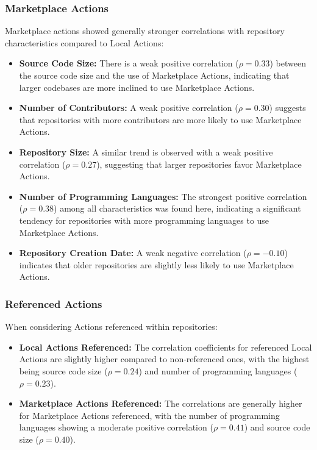 \documentclass[conference]{IEEEtran}
\begin{document}
      \subsubsection{Marketplace Actions}
      Marketplace actions showed generally stronger correlations with repository characteristics compared to Local Actions:
      
      \begin{itemize}
          \item \textbf{Source Code Size:} There is a weak positive correlation (\(\rho = 0.33\)) between the source code size and the use of Marketplace Actions, indicating that larger codebases are more inclined to use Marketplace Actions.
          \item \textbf{Number of Contributors:} A weak positive correlation (\(\rho = 0.30\)) suggests that repositories with more contributors are more likely to use Marketplace Actions.
          \item \textbf{Repository Size:} A similar trend is observed with a weak positive correlation (\(\rho = 0.27\)), suggesting that larger repositories favor Marketplace Actions.
          \item \textbf{Number of Programming Languages:} The strongest positive correlation (\(\rho = 0.38\)) among all characteristics was found here, indicating a significant tendency for repositories with more programming languages to use Marketplace Actions.
          \item \textbf{Repository Creation Date:} A weak negative correlation (\(\rho = -0.10\)) indicates that older repositories are slightly less likely to use Marketplace Actions.\\
      \end{itemize}
      
      \subsubsection{Referenced Actions}
      When considering Actions referenced within repositories:
      
      \begin{itemize}
          \item \textbf{Local Actions Referenced:} The correlation coefficients for referenced Local Actions are slightly higher compared to non-referenced ones, with the highest being source code size (\(\rho = 0.24\)) and number of programming languages (\(\rho = 0.23\)).
          \item \textbf{Marketplace Actions Referenced:} The correlations are generally higher for Marketplace Actions referenced, with the number of programming languages showing a moderate positive correlation (\(\rho = 0.41\)) and source code size (\(\rho = 0.40\)).\\
      \end{itemize}
\end{document}
